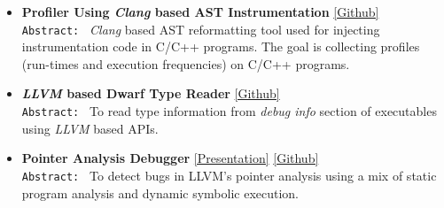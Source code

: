 \documentclass[9pt]{article}
\newenvironment{changemargin}[2]{%
  \begin{list}{}{%
    \setlength{\topsep}{0pt}%
    \setlength{\leftmargin}{#1}%
    \setlength{\rightmargin}{#2}%
    \setlength{\listparindent}{\parindent}%
    \setlength{\itemindent}{\parindent}%
    \setlength{\parsep}{\parskip}%
  }%
  \item[]}{\end{list}
}
\newcommand{\cmnt}[1]{}
\newenvironment{body} {
	\vspace*{-16pt}
	\begin{changemargin}{-0.25in}{-0.5in}
  }	
	{\end{changemargin}
}
\begin{document}
\begin{body}
	\vspace{14pt}
        \cmnt{
	\textbf{Graduate Courses }{} \hfill \\
	\begin{itemize} \itemsep -0pt
          \item \href{http://polaris.cs.illinois.edu/CS598/}{CS598dhp: }Scripting languages -  Design \& Implementation
          \item \href{https://cs.illinois.edu/courses/profile/CS526}{CS526: }Advanced Compiler Construction
          \item \href{https://courses.engr.illinois.edu/cs533/}{CS533: }Parallel Computer Architectures
          \item \href{https://wiki.cites.illinois.edu/wiki/display/cs598lvk/Home}{CS598lvk: }Parallel Programming with Migratable Objects
          \item  \href{https://cs.illinois.edu/courses/profile/CS420}{CS420/CSE402/ECE492: }
                                            Introduction to Parallel Programming for Scientists and Engineers
	\end{itemize}
 \medskip
        }
	\begin{itemize} \itemsep 3pt

           \item \textbf{Profiler Using \emph{Clang} based AST Instrumentation}
           \href{https://github.com/sdasgup3/profiler-using-clang-based-ast-instrumentation}{[Github]} \\ 
           \texttt{Abstract: } \emph{Clang} based AST reformatting tool used for
           injecting instrumentation code in C/C++ programs. The goal is
           collecting profiles (run-times and execution frequencies) on C/C++
           programs.

           \item \textbf{\emph{LLVM} based Dwarf Type Reader} 
           \href{https://github.com/sdasgup3/dwarf-type-reader}{[Github]} \\
             \texttt{Abstract: } To read type information from \emph{debug info}
             section of executables using \emph{LLVM} based APIs.

           \item \textbf{Pointer Analysis Debugger} 
             \href{https://www.dropbox.com/s/pm47zniafdydotw/pa_debugger.pdf?dl=0}{[Presentation]} 
           \href{https://github.com/sdasgup3/symbolic-analysis}{[Github]} \\
                                  \texttt{Abstract: } To detect bugs in LLVM's
                                  pointer analysis using a mix of static
                                  program analysis and dynamic symbolic
                                  execution. 


\end{itemize}
\end{body}
\end{document}
